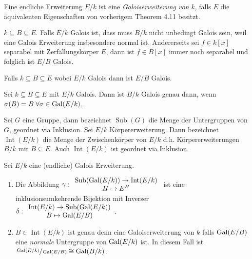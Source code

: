 \begin{definition}
	Eine endliche Erweiterung $E / k$ ist eine \emph{Galoiserweiterung von $k$}, falls $E$ die äquivalenten Eigenschaften von vorherigem Theorem 4.11 besitzt.
\end{definition}

$k \subseteq B \subseteq E$. Falls $E / k$ Galois ist, dass muss $B / k$ nicht unbedingt Galois sein, weil eine Galois Erweiterung insbesondere normal ist.
Andererseits sei $f \in k[x]$ separabel mit Zerfällungskörper $E$, dann ist $f \in B[x]$ immer noch separabel und folglich ist $E / B$ Galois.

\begin{corollary}
	Falls $k \subseteq B \subseteq E$ wobei $E / k $ Galois dann ist $E / B$ Galois.
\end{corollary}

\begin{proposition}
	Sei $k \subseteq B \subseteq E$ mit $E / k$ Galois. Dann ist $B / k$ Galois genau dann, wenn $\sigma(B) = B \forall \sigma \in \gal(E / k)$.
\end{proposition}


\begin{definition}
	Sei $G$ eine Gruppe, dann bezeichnet $\operatorname{Sub}(G)$ die Menge der Untergruppen von $G$, geordnet via Inklusion.
	Sei $E / k$ Körpererweiterung. Dann bezeichnet $\operatorname{Int}(E / k)$ die Menge der Zwischenkörper von $E / k$ d.h. Körpererweiterungen $B / k$ mit $B \subseteq E$.
	Auch $\operatorname{Int}(E / k)$ ist geordnet via Inklusion.
\end{definition}

\begin{theorem}
	Sei $E / k$ eine (endliche) Galois Erweiterung.
	\begin{enumerate}[(1)]
	\item Die Abbildung $\gamma: \begin{array}{c} \operatorname{Sub}(\operatorname{Gal}(E / k)) \to \operatorname{Int}(E / k)\\ H \mapsto E^{H}\\ \end{array}$ ist eine inklusionsumkehrende Bijektion
		mit Inverser $\delta: \begin{array}{c} \operatorname{Int}(E / k) \to \operatorname{Sub}(\operatorname{Gal}(E / k))\\ B \mapsto \operatorname{Gal}(E / B)\\ \end{array}$.
	\item $B \in \operatorname{Int}(E / k)$ ist genau denn eine Galoiserweiterung von $k$ falls $\operatorname{Gal}(E / B)$ eine \emph{normale} Untergruppe von $\operatorname{Gal}(E / k)$ ist.
		In diesem Fall ist $\sfrac{\operatorname{Gal}(E / k)}{\operatorname{Gal}(E / B)} \cong \operatorname{Gal}(B / k)$.
	\end{enumerate}
\end{theorem}



